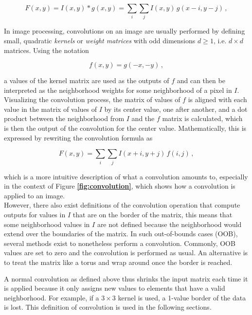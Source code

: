 \[ F(x, y) = I(x, y) * g(x, y) = \sum \limits_i \sum \limits_j I(x, y) \, g(x - i, y - j) \,, \] 

In image processing, convolutions on an image are usually performed by defining small, quadratic \textit{kernels} or \textit{weight matrices} with odd dimensions $d \geq 1$, i.e.  $d \times d$ matrices. Using the notation

\[ f(x, y) = g(-x, -y) \,, \]

a values of the kernel matrix are used as the outputs of $f$ and can then be interpreted as the neighborhood weights for some neighborhood of a pixel in $I$. Visualizing the convolution process, the matrix of values of $f$ is aligned with each value in the matrix of values of $I$ by its center value, one after another, and a dot product between the neighborhood from $I$ and the $f$ matrix is calculated, which is then the output of the convolution for the center value. Mathematically, this is expressed by rewriting the convolution formula as

\[ F(x, y) = \sum \limits_i \sum \limits_j I(x + i, y + j) \, f(i, j) \,, \]

which is a more intuitive description of what a convolution amounts to, especially in the context of Figure \textbf{\ref{fig:convolution}}, which shows how a convolution is applied to an image. \cite[pp. 32-33]{machine_vision}\\

However, there also exist definitions of the convolution operation that compute outputs for values in $I$ that are on the border of the matrix, this means that some neighborhood values in $I$ are not defined because the neighborhood would extend over the boundaries of the matrix. In such out-of-bounds cases (OOB), several methods exist to nonetheless perform a convolution. Commonly, OOB values are set to zero and the convolution is performed as usual. An alternative is to treat the matrix like a torus and wrap around once the border is reached.

A normal convolution as defined above thus shrinks the input matrix each time it is applied because it only assigns new values to elements that have a valid neighborhood. For example, if a $3 \times 3$ kernel is used, a 1-value border of the data is lost. This definition of convolution is used in the following sections.\\

